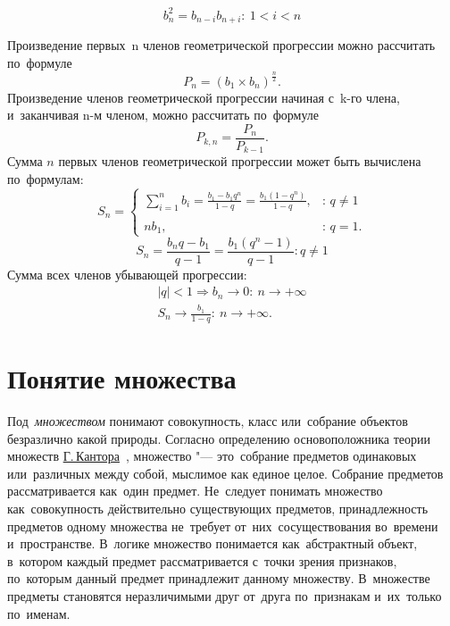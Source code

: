 \documentclass[]{scrartcl}
\begin{document}
\begin{equation}\label{eq:geometric-progression-04}
b_{n}^{2}=b_{n-i}b_{n+i}:\ 1 < i < n
\end{equation}

Произведение первых~n членов геометрической прогрессии можно рассчитать по~формуле
\begin{equation}\label{eq:geometric-progression-05}
P_{n}=(b_{1}\times b_{n})^{\frac{n}{2}}.
\end{equation}
Произведение членов геометрической прогрессии начиная с~k-го члена, и~заканчивая n-м членом, можно рассчитать по~формуле
\begin{equation}\label{eq:geometric-progression-06}
P_{k,n}=\frac{P_{n}}{P_{k-1}}.
\end{equation}
Сумма ${\textstyle n}$ первых членов геометрической прогрессии может быть вычислена по~формулам:
\begin{equation}\label{eq:geometric-progression-07}
S_{n}={\begin{cases}\sum \limits_{i=1}^{n}b_{i}={\frac{b_{1}-b_{1}q^{n}}{1-q}}={\frac{b_{1}\left(1-q^{n}\right)}{1-q}},&{\mbox{: }}q\neq 1\\\\nb_{1},&{\mbox{: }}q=1.\end{cases}} 
\end{equation}
\begin{equation}\label{eq:geometric-progression-08}
S_n=\frac{b_{n}q-b_{1}}{q-1} = \frac{b_{1}(q^{n}-1)}{q-1}: q \neq 1
\end{equation}
Сумма всех членов убывающей прогрессии:
\begin{equation}\label{eq:geometric-progression-09}
\begin{aligned}
\left|q\right|<1 \Rightarrow b_n \to 0:\ n\to +\infty\\ 
S_{n}\to \frac{b_{1}}{1-q}:\ n\to +\infty.
\end{aligned}
\end{equation}


\section{Понятие множества}\label{multiple:definition}
Под~\emph{множеством} понимают совокупность, класс или~собрание объектов безразлично какой природы. Согласно определению основоположника теории множеств \href{https://ru.wikipedia.org/wiki/Кантор,_Георг}{Г.\,Кантора}~\cite{Wiki:Kantor}, множество "--- это~собрание предметов одинаковых или~различных между собой, мыслимое как единое целое. Собрание предметов рассматривается как~один предмет. Не~следует понимать множество как~совокупность действительно существующих предметов, принадлежность предметов одному множества не~требует от~них~сосуществования во~времени и~пространстве. В~логике множество понимается как~абстрактный объект, в~котором каждый предмет рассматривается с~точки зрения признаков, по~которым данный предмет принадлежит данному множеству. В~множестве предметы становятся неразличимыми друг от~друга по~признакам и~их~только по~именам.
\end{document}
